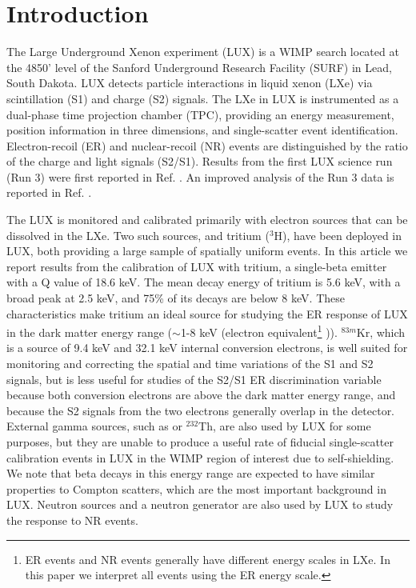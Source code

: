 \section{Introduction}

The Large Underground Xenon experiment (LUX) is a WIMP search located at the 4850' level of the Sanford Underground Research Facility (SURF) in Lead, South Dakota. LUX detects particle interactions in liquid xenon (LXe) via scintillation (S1) and charge (S2) signals. The LXe in LUX is instrumented as a dual-phase time projection chamber (TPC), providing an energy measurement, position information in three dimensions, and single-scatter event identification. Electron-recoil (ER) and nuclear-recoil (NR) events are distinguished by the ratio of the charge and light signals (S2/S1). Results from the first LUX science run (Run 3) were first reported in Ref. \cite{lux-prl}. An improved analysis of the Run 3 data is reported in Ref. \cite{lux-reanalysis}.

The LUX is monitored and calibrated primarily with electron sources that can be dissolved in the LXe. Two such sources,  \krsrc\cite{Kastens:2009rt, Baudis} and tritium ($^{3}$H), have been deployed in LUX, both providing a large sample of spatially uniform events. In this article we report results from the calibration of LUX with tritium, a single-beta emitter with a Q value of 18.6 keV\cite{Tritium_Q}. The mean decay energy of tritium is 5.6 keV, with a broad peak at 2.5 keV, and 75\% of its decays are below 8 keV\cite{Tritium_Mean,Tritium_Eq}. These characteristics make tritium an ideal source for studying the ER response of LUX in the dark matter energy range ($\sim$1-8 keV (electron equivalent\footnote{ER events and NR events generally have different energy scales in LXe. In this paper we interpret all events using the ER energy scale.} )). $^{83m}$Kr, which is a source of 9.4 keV and 32.1 keV internal conversion electrons, is well suited for monitoring and correcting the spatial and time variations of the S1 and S2 signals, but is less useful for studies of the S2/S1 ER discrimination variable because both conversion electrons are above the dark matter energy range, and because the S2 signals from the two electrons generally overlap in the detector. External gamma sources, such as \cssrc or $^{232}$Th, are also used by LUX for some purposes, but they are unable to produce a useful rate of fiducial single-scatter calibration events in LUX in the WIMP region of interest due to self-shielding. We note that beta decays in this energy range are expected to have similar properties to Compton scatters, which are the most important background in LUX. Neutron sources and a neutron generator are also used by LUX to study the response to NR events\cite{DD-paper}.

